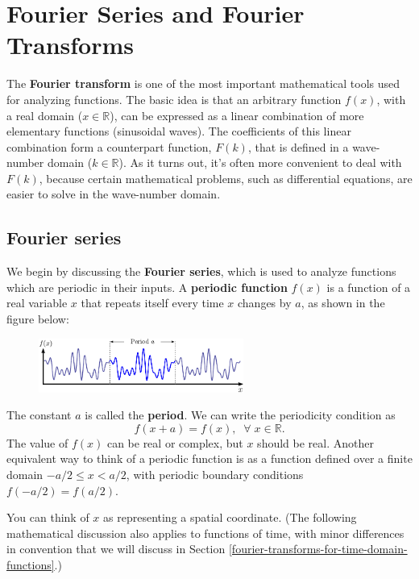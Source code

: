 \documentclass[10pt,a4paper]{article}
\begin{document}
\setcounter{page}{72}

\section{Fourier Series and Fourier Transforms}
\label{fourier-series-and-fourier-transforms}

The \textbf{Fourier transform} is one of the most important mathematical
tools used for analyzing functions. The basic idea is that an arbitrary
function $f(x)$, with a real domain ($x \in \mathbb{R}$), can be
expressed as a linear combination of more elementary functions
(sinusoidal waves). The coefficients of this linear combination form a
counterpart function, $F(k)$, that is defined in a wave-number domain
($k \in \mathbb{R}$). As it turns out, it's often more convenient to
deal with $F(k)$, because certain mathematical problems, such as
differential equations, are easier to solve in the wave-number domain.

\subsection{Fourier series}\label{fourier-series}

We begin by discussing the \textbf{Fourier series}, which is used to
analyze functions which are periodic in their inputs. A \textbf{periodic
function} $f(x)$ is a function of a real variable $x$ that repeats
itself every time $x$ changes by $a$, as shown in the figure below:

\begin{figure}[h]
  \centering\includegraphics[width=0.6\textwidth]{periodicity}
\end{figure}

The constant $a$ is called the \textbf{period}. We can write the
periodicity condition as
\begin{equation}
f(x+a) = f(x), \;\; \forall\; x\in \mathbb{R}.
\end{equation}
The value of $f(x)$ can be real or complex, but $x$ should be real.
Another equivalent way to think of a periodic function is as a function
defined over a finite domain $-a/2 \le x < a/2$, with periodic
boundary conditions $f(-a/2) = f(a/2)$.

You can think of $x$ as representing a spatial coordinate. (The
following mathematical discussion also applies to functions of time,
with minor differences in convention that we will discuss in Section
\ref{fourier-transforms-for-time-domain-functions}.)
\end{document}
